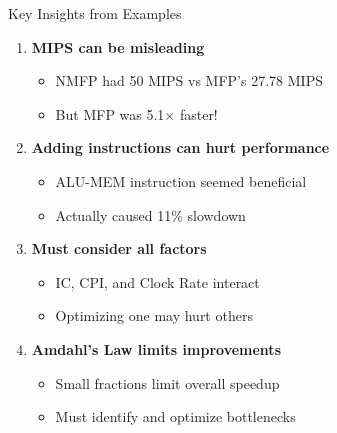\documentclass[aspectratio=169,12pt]{beamer}
\begin{document}
\begin{frame}{Key Insights from Examples}
\begin{enumerate}
    \item \textbf{MIPS can be misleading}
    \begin{itemize}
        \item NMFP had 50 MIPS vs MFP's 27.78 MIPS
        \item But MFP was 5.1× faster!
    \end{itemize}
    
    \item \textbf{Adding instructions can hurt performance}
    \begin{itemize}
        \item ALU-MEM instruction seemed beneficial
        \item Actually caused 11\% slowdown
    \end{itemize}
    
    \item \textbf{Must consider all factors}
    \begin{itemize}
        \item IC, CPI, and Clock Rate interact
        \item Optimizing one may hurt others
    \end{itemize}
    
    \item \textbf{Amdahl's Law limits improvements}
    \begin{itemize}
        \item Small fractions limit overall speedup
        \item Must identify and optimize bottlenecks
    \end{itemize}
\end{enumerate}
\end{frame}
\end{document}
